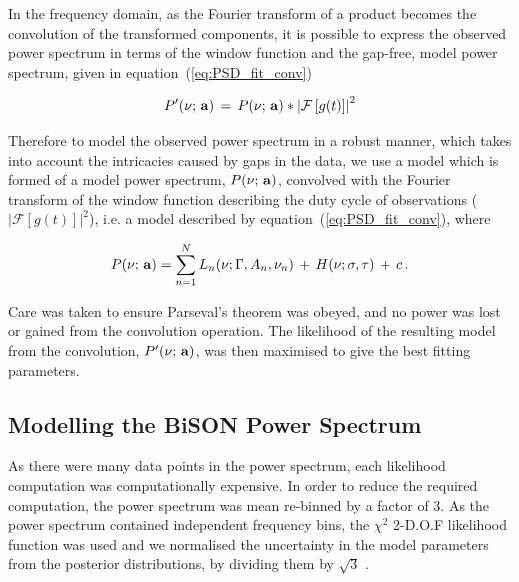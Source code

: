 In the frequency domain, as the Fourier transform of a product becomes the convolution of the transformed components, it is possible to express the observed power spectrum in terms of the window function and the gap-free, model power spectrum, given in equation~(\ref{eq:PSD_fit_conv})

\begin{equation}
P'(\nu; \,{\bf a}) \, = \, P(\nu; \,{\bf a}) * \left|\mathcal{F}\left[g(t)\right]\right|^2
\label{eq:PSD_fit_conv}
\end{equation}

Therefore to model the observed power spectrum in a robust manner, which takes into account the intricacies caused by gaps in the data, we use a model which is formed of a model power spectrum, $P(\nu; \,{\bf a})$, convolved with the Fourier transform of the window function describing the duty cycle of observations ($\left|\mathcal{F}\left[g(t)\right]\right|^2$), i.e. a model described by equation~(\ref{eq:PSD_fit_conv}), where


\begin{equation}
P(\nu; \,{\bf a}) = \sum_{n=1}^{N} L_n(\nu; \Gamma, A_n, \nu_n) \, + \, H(\nu; \sigma, \tau) \, + \, c \, .
\label{eq:PSD_model}
\end{equation}

Care was taken to ensure Parseval's theorem was obeyed, and no power was lost or gained from the convolution operation. The likelihood of the resulting model from the convolution, $P'(\nu; \,{\bf a})$, was then maximised to give the best fitting parameters.





\subsection{Modelling the BiSON Power Spectrum}\label{sec:BiSON_reults}

As there were many data points in the power spectrum, each likelihood computation was computationally expensive. In order to reduce the required computation, the power spectrum was mean re-binned by a factor of 3. As the power spectrum contained independent frequency bins, the $\chi^2$ 2-D.O.F likelihood function was used and we normalised the uncertainty in the model parameters from the posterior distributions, by dividing them by $\sqrt{3}$ \citep{appourchaux_maximum_2003}. 

